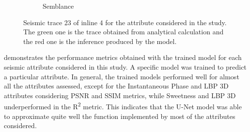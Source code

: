 \documentclass[conference]{IEEEtran}
\def\lbp{LBP 3D\xspace}
\def\unet{\mbox{U-Net}\xspace}
\def\RTwo{R\textsuperscript{2}\xspace}
\begin{document}
\begin{figure}[!t]
\begin{subfigure}[b]{\figcompwidth\textwidth}
        \caption{Semblance}
        \label{fig:setrace}
     \end{subfigure}
        \caption{Seismic trace 23 of inline 4 for the attribute considered in the study. The green one is the trace obtained from analytical calculation and the red one is the inference produced by the model.}
        \label{fig:traces}
\end{figure}


 demonstrates %
the performance metrics obtained with the trained model for each seismic attribute considered in this study. 
A specific model was trained to predict a particular attribute.
%
In general, the trained models performed well for almost all the attributes assessed, except for the Instantaneous Phase and \lbp attributes considering PSNR and SSIM metrics, while Sweetness and \lbp underperformed in the \RTwo metric.
This indicates that the \unet model was able to approximate quite well the function implemented by most of the attributes considered.
\end{document}
